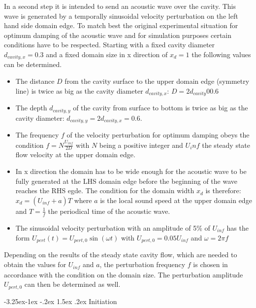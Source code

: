 \documentclass{report}
\makeatletter
\renewcommand\paragraph{\@startsection{paragraph}{4}{\z@}%
  {-3.25ex\@plus -1ex \@minus -.2ex}%
  {1.5ex \@plus .2ex}%
  {\normalfont\normalsize\bfseries}}
\makeatother
\begin{document}
In a second step it is intended to send an acoustic wave over the cavity. This wave is generated by a temporally sinusoidal velocity perturbation on the left hand side domain edge. To match best the original experimental situation for optimum damping of the acoustic wave and for simulation purposes certain conditions have to be respected.
Starting with a fixed cavity diameter $d_\mathit{cavity,x}=0.3$ and a fixed domain size in x direction of $x_d=1$ the following values can be determined.
\begin{itemize}
 \item The distance $D$ from the cavity surface to the upper domain edge (symmetry line) is twice as big as the cavity diameter $d_\mathit{cavity,x}$: $D=2d_\mathit{cavity}00.6$
\item The depth $d_\mathit{cavity,y}$ of the cavity from surface to bottom is twice as big as the cavity diameter: $d_\mathit{cavity,y}=2d_\mathit{cavity,x}=0.6$. 
\item The frequency $f$ of the velocity perturbation for optimum damping obeys the condition $f=N\frac{U_\mathit{inf}}{2 D}$ with $N$ being a positive integer and $U_inf$ the steady state flow velocity at the upper domain edge.
\item In x direction the domain has to be wide enough for the acoustic wave to be fully generated at the LHS domain edge before the beginning of the wave reaches the RHS egde.
The condition for the domain width $x_d$ is therefore: $x_d=(U_\mathit{inf}+a)T$ where $a$ is the local sound speed at the upper domain edge and $T=\frac{1}{f}$ the periodical time of the acoustic wave. 
\item The sinusoidal velocity perturbation with an amplitude of 5\% of $U_\mathit{inf}$ has the form $ U_\mathit{pert}(t)=U_\mathit{pert,0}\sin(\omega t)$ with $U_\mathit{pert,0}=0.05 U_\mathit{inf}$ and $\omega=2\pi f$
 
\end{itemize}
Depending on the results of the steady state cavity flow, which are needed to obtain the values for $U_\mathit{inf}$ and $a$, the perturbation frequency $f$ is chosen in accordance with the condition on the domain size. The perturbation amplitude $U_\mathit{pert,0}$ can then be determined as well.

\paragraph {Initiation}
\end{document}
